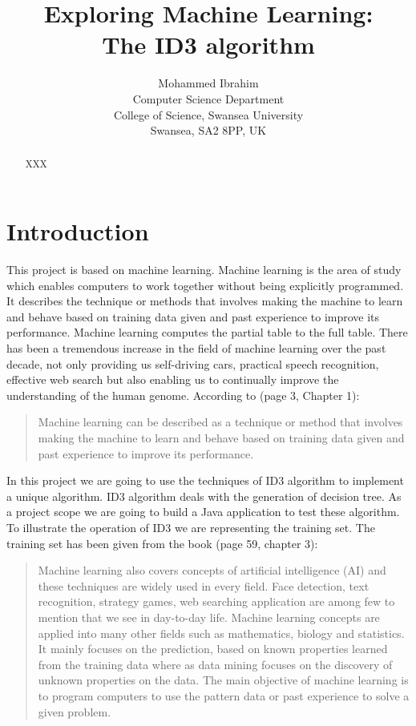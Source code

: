 \documentclass{article}
\begin{document}
\title{Exploring Machine Learning:\\
  The ID3 algorithm}

\author{Mohammed Ibrahim\\
 Computer Science Department\\
  College of Science, Swansea University\\
  Swansea, SA2 8PP, UK
}

\maketitle
\begin{abstract}
  XXX
\end{abstract}

\tableofcontents


\section{Introduction}
\label{sec:int}

This project is based on machine learning. Machine learning is the area of study which enables computers to work together without being explicitly programmed. It describes the technique or methods that involves making the machine to learn and behave based on training data given and past experience to improve its performance. Machine learning computes the partial table to the full table.
There has been a tremendous increase in the field of machine learning over the past decade, not only providing us self-driving cars, practical speech recognition,  effective web search but also enabling us to continually improve the understanding of the human genome. According to \cite{Alpaydin2010MachineLearning}(page 3, Chapter 1):
\begin{quote}
  Machine learning can be described as a technique or method that involves making the machine to learn and behave based on training data given and past experience to improve its performance.
\end{quote}

In this project we are going to use the techniques of ID3 algorithm to implement a unique algorithm. ID3 algorithm deals with the generation of decision tree. As a project scope we are going to build a Java application to test these algorithm. To illustrate the operation of ID3 we are representing the training set.
The training set has been given from the book \cite{Mitchell1997MachineLearning}(page 59, chapter 3):
\begin{quote}
  Machine learning also covers concepts of artificial intelligence (AI) and these techniques are widely used in every field. Face detection, text recognition, strategy games, web searching application are among few to mention that we see in day-to-day life. Machine learning concepts are applied into many other fields such as mathematics, biology and statistics. It mainly focuses on the prediction, based on known properties learned from the training data where as data mining focuses on the discovery of unknown properties on the data.
  The main objective of machine learning is to program computers to use the pattern data or past experience to solve a given problem.
\end{quote}
\end{document}
